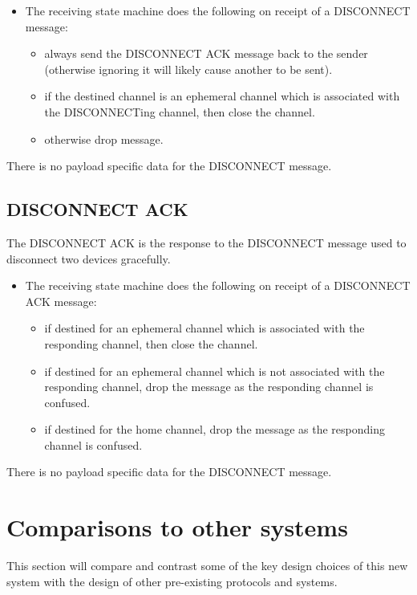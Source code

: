  \begin{itemize}
	\item []The receiving state machine does the following on receipt of a DISCONNECT message:
	\begin{itemize}
		\item always send the DISCONNECT ACK message back to the sender (otherwise ignoring it will likely cause another to be sent).
		\item if the destined channel is an ephemeral channel which is associated with the DISCONNECTing channel, then close the channel.
		\item otherwise drop message. 
	\end{itemize}
\end{itemize}

There is no payload specific data for the DISCONNECT message.

\subsection{DISCONNECT ACK} %
\label{sub:disconnect_ack}
The DISCONNECT ACK is the response to the DISCONNECT message used to disconnect two devices gracefully.

\begin{itemize}
	\item []The receiving state machine does the following on receipt of a DISCONNECT ACK message:
	\begin{itemize}
		\item if destined for an ephemeral channel which is associated with the responding channel, then close the channel.
		\item if destined for an ephemeral channel which is not associated with the responding channel, drop the message as the responding channel is confused. 
		\item if destined for the home channel, drop the message as the responding channel is confused. 
	\end{itemize}
\end{itemize}

There is no payload specific data for the DISCONNECT message.



\section{Comparisons to other systems}
This section will compare and contrast some of the key design choices of this new system with the design of other pre-existing protocols and systems. 

